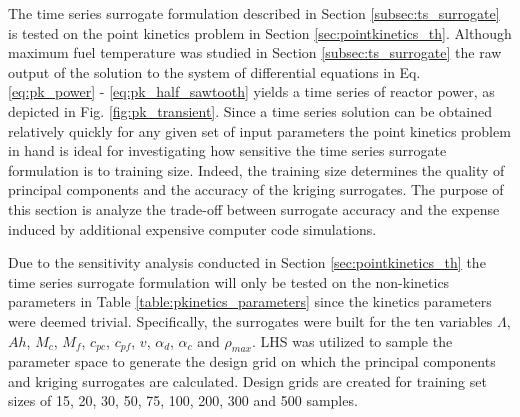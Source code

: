 The time series surrogate formulation described in Section \ref{subsec:ts_surrogate} is tested on the point kinetics problem in Section \ref{sec:pointkinetics_th}. Although maximum fuel temperature was studied in Section \ref{subsec:ts_surrogate} the raw output of the solution to the system of differential equations in Eq. \ref{eq:pk_power} - \ref{eq:pk_half_sawtooth} yields a time series of reactor power, as depicted in Fig. \ref{fig:pk_transient}. Since a time series solution can be obtained relatively quickly for any given set of input parameters the point kinetics problem in hand is ideal for investigating how sensitive the time series surrogate formulation is to training size. Indeed, the training size determines the quality of principal components and the accuracy of the kriging surrogates. The purpose of this section is analyze the trade-off between surrogate accuracy and the expense induced by additional expensive computer code simulations.   

Due to the sensitivity analysis conducted in Section \ref{sec:pointkinetics_th} the time series surrogate formulation will only be tested on the non-kinetics parameters in Table \ref{table:pkinetics_parameters} since the kinetics parameters were deemed trivial. Specifically, the surrogates were built for the ten variables $\Lambda$, $Ah$, $M_c$, $M_f$, $c_{pc}$, $c_{pf}$, $v$, $\alpha_d$, $\alpha_c$ and $\rho_{max}$. \ac{LHS} was utilized to sample the parameter space to generate the design grid on which the principal components and kriging surrogates are calculated. Design grids are created for training set sizes of 15, 20, 30, 50, 75, 100, 200, 300 and 500 samples. 

